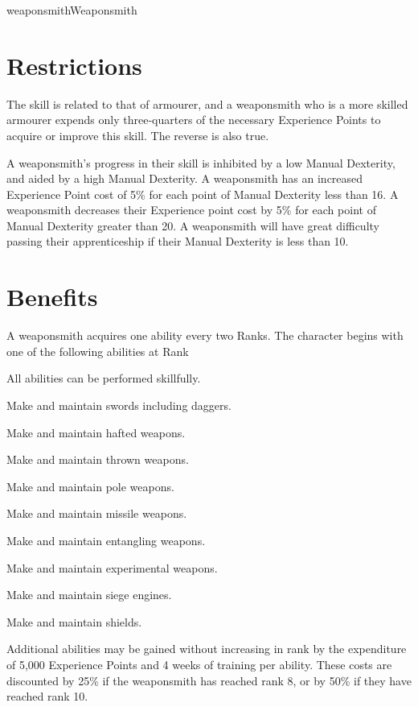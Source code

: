 \begin{Skill}[1.1]{weaponsmith}{Weaponsmith}

\section{Restrictions}

The skill is related to that of armourer, and a weaponsmith who is a
more skilled armourer expends only three-quarters of the necessary
Experience Points to acquire or improve this skill.  The reverse is
also true.

A weaponsmith’s progress in their skill is inhibited by a low Manual
Dexterity, and aided by a high Manual Dexterity.  A weaponsmith has an
increased Experience Point cost of 5\% for each point of Manual
Dexterity less than 16.  A weaponsmith decreases their Experience
point cost by 5\% for each point of Manual Dexterity greater than
20. A weaponsmith will have great difficulty passing their
apprenticeship if their Manual Dexterity is less than 10.

\section{Benefits}

A weaponsmith acquires one ability every two Ranks.  The character
begins with one of the following abilities at Rank

\begin{Enumerate}
\setcounter{enumi}{-1}
\item  All abilities can be performed skillfully. 
\item  Make and maintain swords including daggers. 
\item  Make and maintain hafted weapons. 
\item  Make and maintain thrown weapons. 
\item  Make and maintain pole weapons. 
\item  Make and maintain missile weapons. 
\item  Make and maintain entangling weapons.
\item  Make and maintain experimental weapons. 
\item  Make and maintain siege engines. 
\item  Make and maintain shields. 
\end{Enumerate}

Additional abilities may be gained without increasing in rank by the
expenditure of 5,000 Experience Points and 4 weeks of training per
ability.  These costs are discounted by 25\% if the weaponsmith has
reached rank 8, or by 50\% if they have reached rank 10.


\end{Skill}
